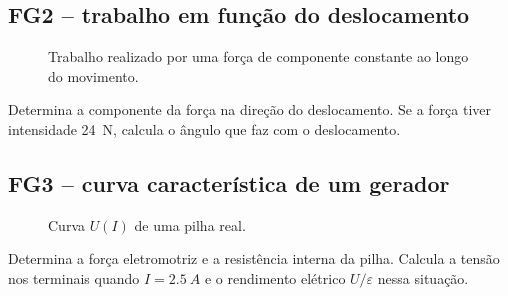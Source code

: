 \documentclass[11pt,a4paper,oneside]{book}
\begin{document}
\subsection*{FG2 -- trabalho em função do deslocamento}
\begin{figure}[H]
\centering
{}
\caption{Trabalho realizado por uma força de componente constante ao longo do movimento.}
\end{figure}
\begin{exercicios}[title=Exercício FG2]
Determina a componente da força na direção do deslocamento. Se a força tiver intensidade \SI{24}{N}, calcula o ângulo que faz com o deslocamento.
\end{exercicios}

\subsection*{FG3 -- curva característica de um gerador}
\begin{figure}[H]
\centering
{}
\caption{Curva $U(I)$ de uma pilha real.}
\end{figure}
\begin{exercicios}[title=Exercício FG3]
Determina a força eletromotriz e a resistência interna da pilha. Calcula a tensão nos terminais quando $I=\SI{2.5}{A}$ e o rendimento elétrico $U/\varepsilon$ nessa situação.
\end{exercicios}
\end{document}
